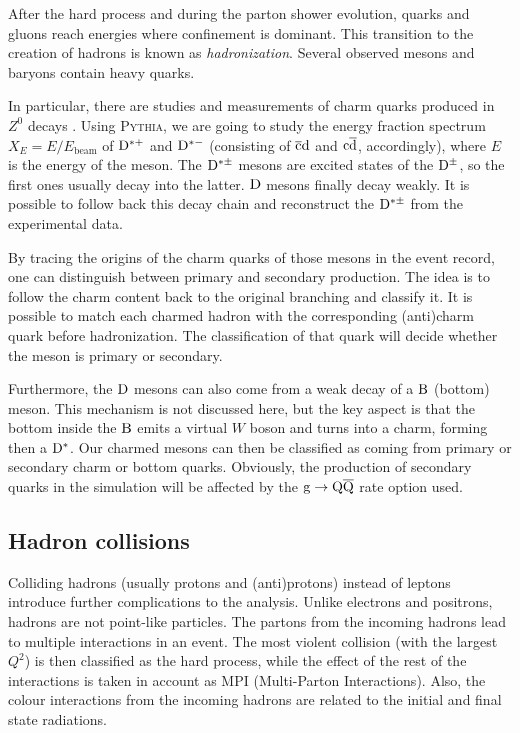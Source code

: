 \documentclass[a4paper,12pt]{article}
\begin{document}
After the hard process and during the parton shower evolution, quarks and gluons reach energies where confinement is dominant. This transition to the creation of hadrons is known as \textit{hadronization}. Several observed mesons and baryons contain heavy quarks.

In particular, there are studies and measurements of charm quarks produced in $Z^0$ decays \cite{Barate:1999bg}. Using \textsc{Pythia}, we are going to study the energy fraction spectrum $X_E=E/E_{\mbox{beam}}$ of ${\mathrm D}^{*+}$ and ${\mathrm D}^{*-}$ (consisting of $\overline{\mathrm c}{\mathrm d}$ and ${\mathrm c}\overline{\mathrm d}$, accordingly), where $E$ is the energy of the meson. The ${\mathrm D}^{*\pm}$ mesons are excited states of the ${\mathrm D}^{\pm}$, so the first ones usually decay into the latter. ${\mathrm D}$ mesons finally decay weakly. It is possible to follow back this decay chain and reconstruct the ${\mathrm D}^{*\pm}$ from the experimental data.

By tracing the origins of the charm quarks of those mesons in the event record, one can distinguish between primary and secondary production. The idea is to follow the charm content back to the original branching and classify it. It is possible to match each charmed hadron with the corresponding (anti)charm quark before hadronization. The classification of that quark will decide whether the meson is primary or secondary.

Furthermore, the ${\mathrm D}$ mesons can also come from a weak decay of a ${\mathrm B}$ (bottom) meson. This mechanism is not discussed here, but the key aspect is that the bottom inside the ${\mathrm B}$ emits a virtual $W$ boson and turns into a charm, forming then a ${\mathrm D}^*$. Our charmed mesons can then be classified as coming from primary or secondary charm or bottom quarks. Obviously, the production of secondary quarks in the simulation will be affected by the ${\mathrm g}\to{\mathrm Q}\overline{\mathrm Q}$ rate option used.

\subsection{Hadron collisions}

Colliding hadrons (usually protons and (anti)protons) instead of leptons introduce further complications to the analysis. Unlike electrons and positrons, hadrons are not point-like particles. The partons from the incoming hadrons lead to multiple interactions in an event. The most violent collision (with the largest $Q^2$) is then classified as the hard process, while the effect of the rest of the interactions is taken in account as MPI (Multi-Parton Interactions). Also, the colour interactions from the incoming hadrons are related to the initial and final state radiations. 
\end{document}
